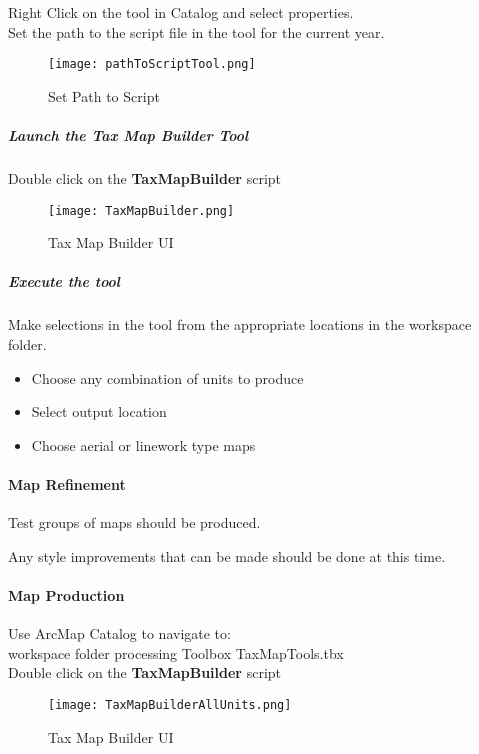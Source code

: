 \noindent Right Click on the tool in Catalog and select properties.\\
Set the path to the script file in the tool for the current year.


\begin{figure}[h!]
 \centering
     \texttt{[image: pathToScriptTool.png]}
 \caption{Set Path to Script}
 \end{figure}

\clearpage

\subparagraph{Launch the Tax Map Builder Tool}
Double click on the \textbf{TaxMapBuilder} script

\begin{figure}[h!]
 \centering
     \texttt{[image: TaxMapBuilder.png]}
 \caption{Tax Map Builder UI}
 \end{figure}


\subparagraph{Execute the tool}

\noindent Make selections in the tool from the appropriate locations in the workspace folder.

\begin{itemize}
\item Choose any combination of units to produce
\item Select output location
\item Choose aerial or linework type maps
\end{itemize}
\clearpage
\paragraph{Map Refinement}Test groups of maps should be produced.

\noindent Any style improvements that can be made should be done at this time.

\paragraph{Map Production}

Use ArcMap Catalog to navigate to:\\
workspace folder{\menuArrow} processing {\menuArrow} Toolbox {\menuArrow} TaxMapTools.tbx\\
Double click on the \textbf{TaxMapBuilder} script
\begin{figure}[h!]
 \centering
     \texttt{[image: TaxMapBuilderAllUnits.png]}
 \caption{Tax Map Builder UI}
 \end{figure}

